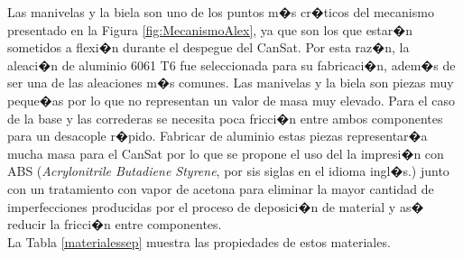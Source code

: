 \documentclass[10pt,a4paper]{book}
\begin{document}
\begin{table}[H]
\begin{center}
\caption{Traducci�n de requerimientos a prescripciones de materiales del SLVC.}
\label{Alex3}
\end{center}
\end{table}

Las manivelas y la biela son uno de los puntos m�s cr�ticos del mecanismo presentado en la Figura \ref{fig:MecanismoAlex}, ya que son los que estar�n sometidos a flexi�n durante el despegue del CanSat. Por esta raz�n, la aleaci�n de aluminio 6061 T6 fue seleccionada para su fabricaci�n, adem�s de ser una de las aleaciones m�s comunes. Las manivelas y la biela son piezas muy peque�as por lo que no representan un valor de masa muy elevado.
Para el caso de la base y las correderas se necesita poca fricci�n entre ambos componentes para un desacople r�pido. Fabricar de aluminio estas piezas representar�a mucha masa para el CanSat por lo que se propone el uso del la impresi�n con ABS (\textit{Acrylonitrile Butadiene Styrene}, por sis siglas en el idioma ingl�s.) junto con un tratamiento con vapor de acetona para eliminar la mayor cantidad de imperfecciones producidas por el proceso de deposici�n de material y as� reducir la fricci�n entre componentes. \\

La Tabla \ref{materialessep} muestra las propiedades de estos materiales.

\begin{table}[H]
\begin{center}
\caption{Materiales del SLVC.}
\label{materialessep}
\end{center}
\end{table}
\end{document}
